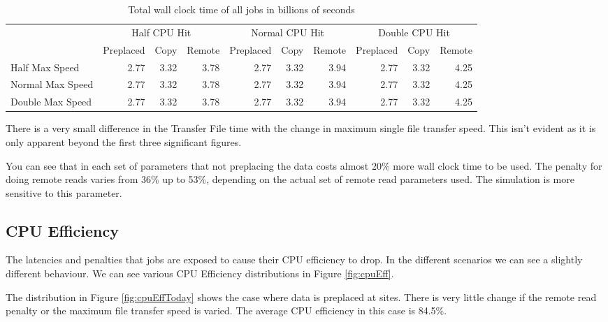 \documentclass[a4paper]{jpconf}
\begin{document}
\begin{table}
  \begin{center}
    \begin{scriptsize}
      \begin{tabular}{|l|rrr|rrr|rrr|}
        \hline
        & \multicolumn{3}{|c|}{Half CPU Hit} & \multicolumn{3}{|c|}{Normal CPU
          Hit} & \multicolumn{3}{|c|}{Double CPU Hit} \\
        \cline{2-10}
        & Preplaced & Copy & Remote & Preplaced & Copy & Remote
        & Preplaced & Copy & Remote \\
        \hline
        Half Max Speed & 2.77 & 3.32 & 3.78 & 2.77 & 3.32 & 3.94 & 2.77
        & 3.32 & 4.25 \\
        Normal Max Speed & 2.77 & 3.32 & 3.78 & 2.77 & 3.32 & 3.94 & 2.77
        & 3.32 & 4.25 \\
        Double Max Speed & 2.77 & 3.32 & 3.78 & 2.77 & 3.32 & 3.94 & 2.77
        & 3.32 & 4.25 \\
        \hline
      \end{tabular}
      \caption{Total wall clock time of all jobs in billions of seconds\label{tab:wallClock}}
    \end{scriptsize}
  \end{center}
\end{table}

There is a very small difference in the Transfer File time with the
change in maximum single file transfer speed. This isn't evident as it
is only apparent beyond the first three significant figures.

You can see that in each set of parameters that not preplacing the
data costs almost 20\% more wall clock time to be used. The penalty
for doing remote reads varies from 36\% up to 53\%, depending on the
actual set of remote read parameters used. The simulation is more
sensitive to this parameter.

\subsection{CPU Efficiency}

The latencies and penalties that jobs are exposed to cause their CPU
efficiency to drop. In the different scenarios we can see a slightly
different behaviour. We can see various CPU Efficiency distributions in
Figure \ref{fig:cpuEff}.

The distribution in Figure \ref{fig:cpuEffToday} shows the case where
data is preplaced at sites. There is very little change if the remote
read penalty or the maximum file transfer speed is varied. The average
CPU efficiency in this case is 84.5\%.
\end{document}

